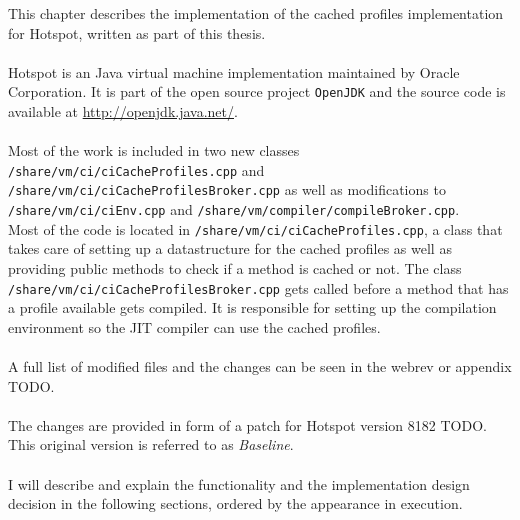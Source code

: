This chapter describes the implementation of the cached profiles implementation for Hotspot, written as part of this thesis.
\\\\
Hotspot is an Java virtual machine implementation maintained by Oracle Corporation. It is part of the open source project \texttt{OpenJDK} and the source code is available at \url{http://openjdk.java.net/}.
\\\\
Most of the work is included in two new classes \texttt{/share/vm/ci/ciCacheProfiles.cpp} and \\\texttt{/share/vm/ci/ciCacheProfilesBroker.cpp} as well as modifications to \texttt{/share/vm/ci/ciEnv.cpp} and \texttt{/share/vm/compiler/compileBroker.cpp}.
\\
Most of the code is located in \texttt{/share/vm/ci/ciCacheProfiles.cpp}, a class that takes care of setting up a datastructure for the cached profiles as well as providing public methods to check if a method is cached or not. The class \texttt{/share/vm/ci/ciCacheProfilesBroker.cpp} gets called before a method that has a profile available gets compiled. It is responsible for setting up the compilation environment so the JIT compiler can use the cached profiles.
\\\\
A full list of modified files and the changes can be seen in the webrev or appendix TODO.
\\\\
The changes are provided in form of a patch for Hotspot version 8182 TODO. This original version is referred to as \textit{Baseline}.
\\\\
I will describe and explain the functionality and the implementation design decision in the following sections, ordered by the appearance in execution.


